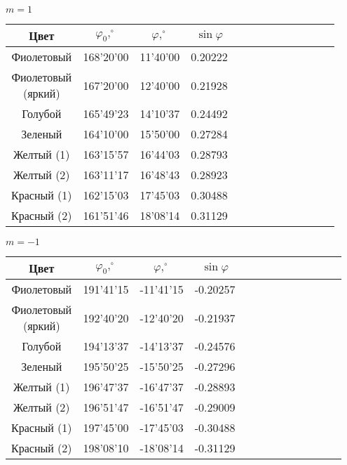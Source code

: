 \documentclass[14pt]{article}
\begin{document}
\vspace{1cm}
$m = 1$
\begin{center}
\begin{tabular}{|c|c|c|c|c|c|c|c|c|c|c|c|c|}
\hline
Цвет		&	$\varphi_0, ^\circ$		&	$\varphi, ^\circ$ 			&	$\sin\varphi$	\\
\hline
Фиолетовый	&	168'20'00				&	11'40'00					&	0.20222			\\
\hline
\shortstack{Фиолетовый\\(яркий)}		&	167'20'00	&	12'40'00	&	0.21928			\\
\hline
Голубой		&	165'49'23				&	14'10'37					&	0.24492			\\
\hline
Зеленый		&	164'10'00				&	15'50'00					&	0.27284			\\
\hline
Желтый (1)	&	163'15'57				&	16'44'03					&	0.28793			\\
\hline
Желтый (2)	&	163'11'17				&	16'48'43					&	0.28923			\\
\hline
Красный (1)	&	162'15'03				&	17'45'03					&	0.30488			\\
\hline
Красный (2)	&	161'51'46				&	18'08'14					&	0.31129			\\
\hline
\end{tabular}
\end{center}

$m = -1$
\begin{center}
\begin{tabular}{|c|c|c|c|c|c|c|c|c|c|c|c|c|}
\hline
Цвет		&	$\varphi_0, ^\circ$		&	$\varphi, ^\circ$ 			&	$\sin\varphi$	\\
\hline
Фиолетовый	&	191'41'15				&	-11'41'15					&	-0.20257		\\
\hline
\shortstack{Фиолетовый\\(яркий)}		&	192'40'20	&	-12'40'20	&	-0.21937		\\
\hline
Голубой		&	194'13'37				&	-14'13'37					&	-0.24576		\\
\hline
Зеленый		&	195'50'25				&	-15'50'25					&	-0.27296		\\
\hline
Желтый (1)	&	196'47'37				&	-16'47'37					&	-0.28893		\\
\hline
Желтый (2)	&	196'51'47				&	-16'51'47					&	-0.29009		\\
\hline
Красный (1)	&	197'45'00				&	-17'45'03					&	-0.30488		\\
\hline
Красный (2)	&	198'08'10				&	-18'08'14					&	-0.31129		\\
\hline
\end{tabular}
\end{center}
\end{document}
